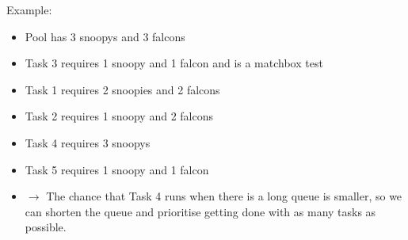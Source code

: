 \documentclass[xcolor=pdftex,dvipsnames,table]{beamer}
\begin{document}
\begin{frame}
Example:
\begin{itemize}
  \item Pool has 3 snoopys and 3 falcons
  \item Task 3 requires 1 snoopy and 1 falcon and is a matchbox test
  \item Task 1 requires 2 snoopies and 2 falcons
  \item Task 2 requires 1 snoopy and 2 falcons
  \item Task 4 requires 3 snoopys
  \item Task 5 requires 1 snoopy and 1 falcon
  \item $\rightarrow$ The chance that Task 4 runs when there is a long
    queue is smaller, so we can shorten the queue and prioritise
    getting done with as many tasks as possible.
\end{itemize}
\end{frame}
\end{document}
